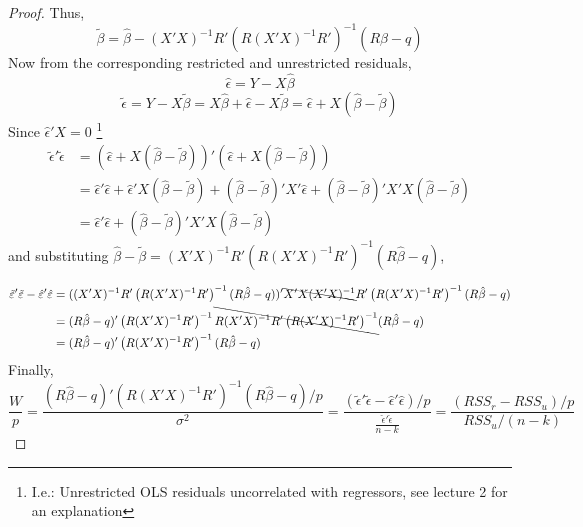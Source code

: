 \documentclass[DIV=14,titlepage=false]{scrreprt}
\begin{document}
\begin{proof}
Thus,
\[
\tilde{\beta} = \hat{\beta} - (X'X)^{-1}R'\left(R(X'X)^{-1}R'\right)^{-1}(R\hat{\beta} - q)
\]
Now from the corresponding restricted and unrestricted residuals,
\[
\hat{\epsilon} = Y - X\hat{\beta}
\]
\[
\tilde{\epsilon} = Y - X\tilde{\beta} = X\hat{\beta} + \hat{\epsilon} - X\tilde{\beta} = \hat{\epsilon} + X(\hat\beta - \tilde{\beta})
\]
Since \(\hat\epsilon'X = 0\) \footnote[1]{I.e.: Unrestricted OLS residuals uncorrelated with regressors, see lecture 2 for an explanation}
\begin{align*}
\tilde{\epsilon}'\tilde{\epsilon} &= (\hat{\epsilon} + X(\hat\beta - \tilde{\beta}))'(\hat{\epsilon} + X(\hat\beta - \tilde{\beta}))\\
&= \hat{\epsilon}'\hat{\epsilon} + \hat{\epsilon}'X(\hat\beta - \tilde{\beta}) + (\hat\beta - \tilde{\beta})'X'\hat{\epsilon}+(\hat{\beta} - \tilde{\beta})'X'X(\hat{\beta} - \tilde{\beta})\\
&= \hat{\epsilon}'\hat{\epsilon} + (\hat{\beta} - \tilde{\beta})'X'X(\hat{\beta} - \tilde{\beta})
\end{align*}
and substituting \(\hat{\beta} - \tilde{\beta} = (X'X)^{-1}R'\left(R(X'X)^{-1}R'\right)^{-1}(R\hat{\beta} - q)\),


\begin{align*}
\tilde{\epsilon}'\tilde{\epsilon} - \hat{\epsilon}'\hat{\epsilon} &= ((X'X)^{-1}R'\left(R(X'X)^{-1}R'\right)^{-1}(R\hat{\beta} - q))'\bcancel{X'X(X'X)^{-1}}R'\left(R(X'X)^{-1}R'\right)^{-1}(R\hat{\beta} - q)\\
&=(R\hat{\beta} - q)'\left(R(X'X)^{-1}R'\right)^{-1}\bcancel{R(X'X)^{-1}R'\left(R(X'X)^{-1}R'\right)^{-1}}(R\hat{\beta} - q)\\
&=(R\hat{\beta} - q)'\left(R(X'X)^{-1}R'\right)^{-1}(R\hat{\beta} - q)
\end{align*}
Finally,
\[
\frac{W}{p} = \frac{(R\hat{\beta} - q)'\left(R(X'X)^{-1}R'\right)^{-1}(R\hat{\beta} - q)/p}{\sigma^2} = \frac{(\tilde{\epsilon}'\tilde{\epsilon} - \hat{\epsilon}'\hat{\epsilon})/p}{\frac{\hat{\epsilon}'\hat{\epsilon}}{n-k}} = \frac{(RSS_r - RSS_u)/p}{RSS_u/(n - k)}
\]


\end{proof}
\end{document}
